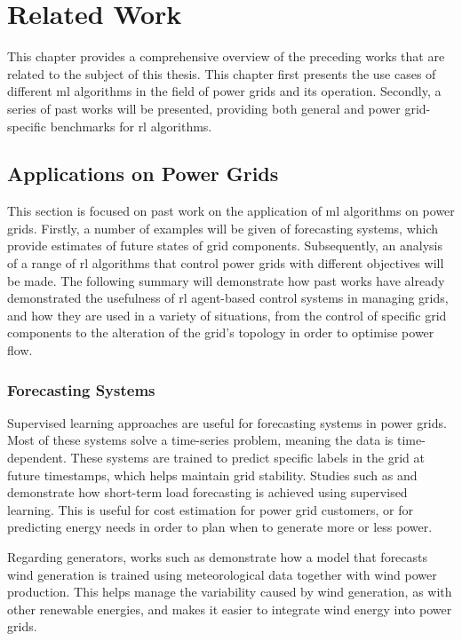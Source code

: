 \chapter{Related Work}\label{ch:related-work}
This chapter provides a comprehensive overview of the preceding works that are related to the subject of this thesis. This chapter first presents the use cases of different \ac{ml} algorithms in the field of power grids and its operation. Secondly, a series of past works will be presented, providing both general and power grid-specific benchmarks for \ac{rl} algorithms.


\section{Applications on Power Grids}\label{sec:application-power-grids}
This section is focused on past work on the application of \ac{ml} algorithms on power grids. Firstly, a number of examples will be given of forecasting systems, which provide estimates of future states of grid components. Subsequently, an analysis of a range of \ac{rl} algorithms that control power grids with different objectives will be made. The following summary will demonstrate how past works have already demonstrated the usefulness of \ac{rl} agent-based control systems in managing grids, and how they are used in a variety of situations, from the control of specific grid components to the alteration of the grid's topology in order to optimise power flow. 


\subsection{Forecasting Systems}
Supervised learning approaches are useful for forecasting systems in power grids. Most of these systems solve a time-series problem, meaning the data is time-dependent. These systems are trained to predict specific labels in the grid at future timestamps, which helps maintain grid stability. 
Studies such as \citet{shortTermLoadForecasting} and \citet{loadForecastingDeepNN} demonstrate how short-term load forecasting is achieved using supervised learning. This is useful for cost estimation for power grid customers, or for predicting energy needs in order to plan when to generate more or less power.

Regarding generators, works such as \citet{meka2021robust} demonstrate how a model that forecasts wind generation is trained using meteorological data together with wind power production. This helps manage the variability caused by wind generation, as with other renewable energies, and makes it easier to integrate wind energy into power grids. 

